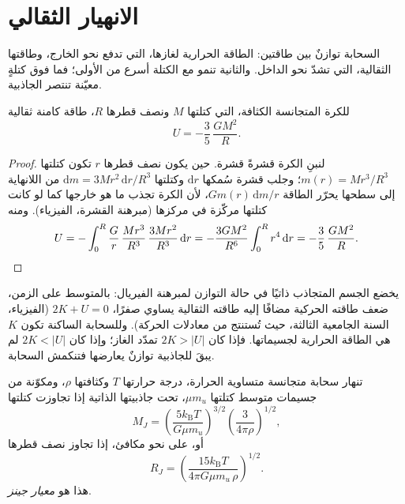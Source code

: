 \section{الانهيار الثقالي}

السحابة توازنٌ بين طاقتين: الطاقة الحرارية لغازها،
التي تدفع نحو الخارج، وطاقتها الثقالية، التي تشدّ نحو الداخل. والثانية
تنمو مع الكتلة أسرع من الأولى؛ فما فوق كتلةٍ معيّنة تنتصر
الجاذبية.

\begin{proposition}
\label{prop:b2:ism-star-formation:grav-energy}
للكرة المتجانسة الكثافة، التي كتلتها $M$ ونصف قطرها $R$،
طاقة كامنة ثقالية
\[
  U = -\frac{3}{5}\,\frac{G M^2}{R}.
\]
\end{proposition}

\begin{proof}
لنبنِ الكرة قشرةً قشرة. حين يكون نصف قطرها $r$ تكون كتلتها
$m(r) = M r^3/R^3$؛ وجلب قشرة سُمكها $\mathrm dr$ وكتلتها
$\mathrm dm = 3M r^2\,\mathrm dr/R^3$ من اللانهاية إلى سطحها يحرّر
الطاقة $G m(r)\,\mathrm dm/r$، لأن الكرة تجذب ما هو خارجها كما لو كانت
كتلتها مركّزة في مركزها (مبرهنة القشرة، الفيزياء). ومنه
\[
  U = -\int_0^R \frac{G}{r}\,\frac{M r^3}{R^3}\,\frac{3 M r^2}{R^3}\,\mathrm dr
    = -\frac{3 G M^2}{R^6}\int_0^R r^4\,\mathrm dr = -\frac{3}{5}\,\frac{G M^2}{R}.
  \qedhere
\]
\end{proof}

يخضع الجسم المتجاذب ذاتيًا في حالة التوازن لمبرهنة الفيريال: بالمتوسط
على الزمن، ضعف طاقته الحركية مضافًا إليه طاقته الثقالية يساوي صفرًا،
$2K + U = 0$ (الفيزياء، السنة الجامعية الثالثة، حيث تُستنتج من
معادلات الحركة). وللسحابة الساكنة تكون $K$ هي الطاقة الحرارية
لجسيماتها. فإذا كان $2K > |U|$ تمدّد الغاز؛ وإذا كان $2K < |U|$ لم يبقَ للجاذبية
توازنٌ يعارضها فتنكمش السحابة.

\begin{proposition}\label{prop:b2:ism-star-formation:jeans}
تنهار سحابة متجانسة متساوية الحرارة، درجة حرارتها $T$ وكثافتها $\rho$، ومكوّنة من
جسيمات متوسط كتلتها $\mu m_u$، تحت جاذبيتها الذاتية إذا تجاوزت كتلتها
\emph{}
\[
  M_J = \left(\frac{5 k_{\mathrm B} T}{G\mu m_u}\right)^{3/2}
        \left(\frac{3}{4\pi\rho}\right)^{1/2},
\]
أو، على نحو مكافئ، إذا تجاوز نصف قطرها \emph{}
\[
  R_J = \left(\frac{15 k_{\mathrm B} T}{4\pi G\mu m_u\,\rho}\right)^{1/2}.
\]
هذا هو \emph{معيار جينز}.
\end{proposition}


